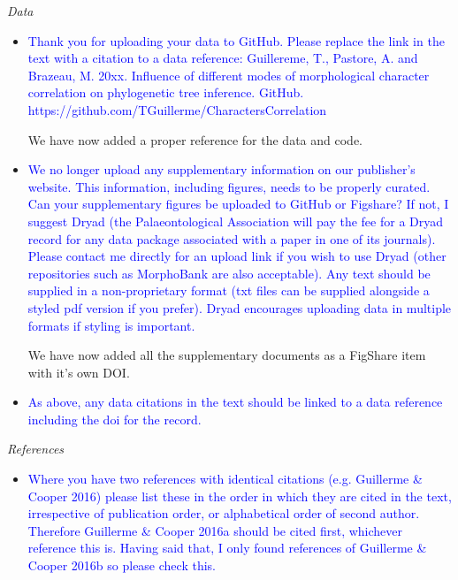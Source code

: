 \documentclass[12pt,letterpaper]{article}
\renewcommand{\subsection}[1]{%
\bigskip
\begin{center}
\begin{large}
\normalfont\itshape #1
\end{large}
\end{center}}
\begin{document}
\subsection{Data}

\begin{itemize}
\item{\textcolor{blue}{Thank you for uploading your data to GitHub. Please replace the link in the text with a citation to a data reference: Guillereme, T., Pastore, A. and Brazeau, M. 20xx. Influence of different modes of morphological character correlation on phylogenetic tree inference. GitHub. https://github.com/TGuillerme/CharactersCorrelation}}

We have now added a proper reference for the data and code.

\item{\textcolor{blue}{We no longer upload any supplementary information on our publisher's website. This information, including figures, needs to be properly curated. Can your supplementary figures be uploaded to GitHub or Figshare? If not, I suggest Dryad (the Palaeontological Association will pay the fee for a Dryad record for any data package associated with a paper in one of its journals). Please contact me directly for an upload link if you wish to use Dryad (other repositories such as MorphoBank are also acceptable). Any text should be supplied in a non-proprietary format (txt files can be supplied alongside a styled pdf version if you prefer). Dryad encourages uploading data in multiple formats if styling is important.}}

We have now added all the supplementary documents as a FigShare item with it's own DOI.

\item{\textcolor{blue}{As above, any data citations in the text should be linked to a data reference including the doi for the record.}}
\end{itemize}

\subsection{References}
\begin{itemize}
\item{\textcolor{blue}{Where you have two references with identical citations (e.g. Guillerme \& Cooper 2016) please list these in the order in which they are cited in the text, irrespective of publication order, or alphabetical order of second author. Therefore Guillerme \& Cooper 2016a should be cited first, whichever reference this is. Having said that, I only found references of Guillerme \& Cooper 2016b so please check this.}}
\end{itemize}
\end{document}
